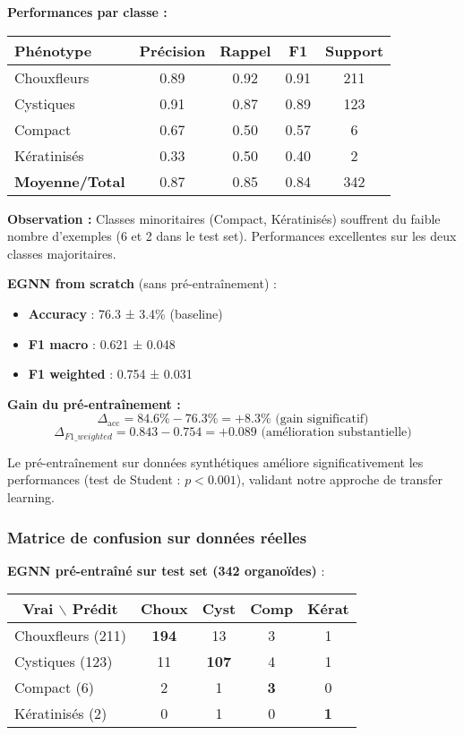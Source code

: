 \textbf{Performances par classe :}
\begin{center}
\begin{tabular}{|l|c|c|c|c|}
\hline
\textbf{Phénotype} & \textbf{Précision} & \textbf{Rappel} & \textbf{F1} & \textbf{Support} \\
\hline
Chouxfleurs & 0.89 & 0.92 & 0.91 & 211 \\
Cystiques & 0.91 & 0.87 & 0.89 & 123 \\
Compact & 0.67 & 0.50 & 0.57 & 6 \\
Kératinisés & 0.33 & 0.50 & 0.40 & 2 \\
\hline
\textbf{Moyenne/Total} & 0.87 & 0.85 & 0.84 & 342 \\
\hline
\end{tabular}
\end{center}

\textbf{Observation :} Classes minoritaires (Compact, Kératinisés) souffrent du faible nombre d'exemples (6 et 2 dans le test set). Performances excellentes sur les deux classes majoritaires.

\textbf{EGNN from scratch} (sans pré-entraînement) :
\begin{itemize}
    \item \textbf{Accuracy} : 76.3 ± 3.4\% (baseline)
    \item \textbf{F1 macro} : 0.621 ± 0.048
    \item \textbf{F1 weighted} : 0.754 ± 0.031
\end{itemize}

\textbf{Gain du pré-entraînement :}
\[
\Delta_{\text{acc}} = 84.6\% - 76.3\% = +8.3\% \text{ (gain significatif)}
\]
\[
\Delta_{F1\_weighted} = 0.843 - 0.754 = +0.089 \text{ (amélioration substantielle)}
\]

Le pré-entraînement sur données synthétiques améliore significativement les performances (test de Student : $p < 0.001$), validant notre approche de transfer learning.

\subsubsection{Matrice de confusion sur données réelles}

\textbf{EGNN pré-entraîné sur test set (342 organoïdes)} :

\begin{center}
\begin{tabular}{|l|cccc|}
\hline
\multicolumn{1}{|c|}{\textbf{Vrai $\backslash$ Prédit}} & \textbf{Choux} & \textbf{Cyst} & \textbf{Comp} & \textbf{Kérat} \\
\hline
Chouxfleurs (211) & \textbf{194} & 13 & 3 & 1 \\
Cystiques (123) & 11 & \textbf{107} & 4 & 1 \\
Compact (6) & 2 & 1 & \textbf{3} & 0 \\
Kératinisés (2) & 0 & 1 & 0 & \textbf{1} \\
\hline
\end{tabular}
\end{center}

